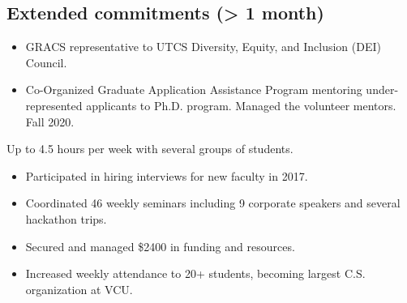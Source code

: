 \documentclass[11pt,letterpaper,serif]{moderncv}
\begin{document}
\smallskip
\subsection{Extended commitments (> 1 month)}

{
\begin{adjustwidth}{.25in}{}
	\begin{itemize}
		\item GRACS representative to UTCS Diversity, Equity, and Inclusion (DEI) Council.
		\item Co-Organized Graduate Application Assistance Program mentoring under-represented applicants to Ph.D. program. Managed the volunteer mentors. Fall 2020.
	\end{itemize}
\end{adjustwidth}
}

{
	\begin{adjustwidth}{.25in}{}
		Up to 4.5 hours per week with several groups of students.
	\end{adjustwidth}
}

{
	\begin{adjustwidth}{.25in}{}
		\begin{itemize}
			\item Participated in hiring interviews for new faculty in 2017.
		\end{itemize}
	\end{adjustwidth}
}

{
	\begin{adjustwidth}{.25in}{}
		\begin{itemize}
			\item Coordinated 46 weekly seminars including 9 corporate speakers and several hackathon trips.
			\item Secured and managed \$2400 in funding and resources.
			\item Increased weekly attendance to 20+ students, becoming largest C.S. organization at VCU.
		\end{itemize}
	\end{adjustwidth}
}
\end{document}
